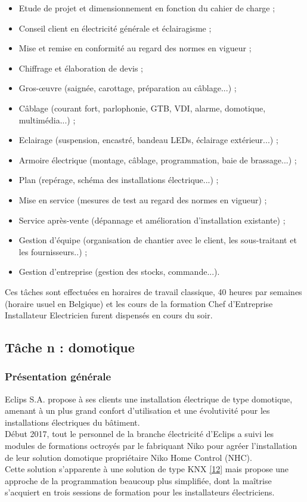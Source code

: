\documentclass[a4paper, 12pt]{article}
\begin{document}
\begin{itemize}

  \item Etude de projet et dimensionnement en fonction du cahier de charge ;
  \item Conseil client en électricité générale et éclairagisme ;  
  \item Mise et remise en conformité au regard des normes en vigueur ;
  \item Chiffrage et élaboration de devis ;
  \item Gros-\oe{}uvre (saignée, carottage, préparation au câblage...) ;
  \item Câblage (courant fort, parlophonie, GTB, VDI, alarme, domotique, multimédia...) ;
  \item Eclairage (suspension, encastré, bandeau LEDs, éclairage extérieur...) ;
  \item Armoire électrique (montage, câblage, programmation, baie de brassage...) ;
  \item Plan (repérage, schéma des installations électrique...) ;
  \item Mise en service (mesures de test au regard des normes en vigueur) ;
  \item Service après-vente (dépannage et amélioration d’installation existante) ;
  \item Gestion d'équipe (organisation de chantier avec le client, les sous-traitant et les fournisseurs..) ;
  \item Gestion d'entreprise (gestion des stocks, commande...).
    
\end{itemize}
Ces tâches sont effectuées en horaires de travail classique, 40 heures par semaines (horaire usuel en Belgique) et les cours de la formation Chef d'Entreprise Installateur Electricien furent dispensés en cours du soir.

\subsection{Tâche n : domotique}

\subsubsection{Présentation générale}

Eclips S.A. propose à ses clients une installation électrique de type domotique, amenant à un plus grand confort d'utilisation et une évolutivité pour les installations électriques du bâtiment.\\
Début 2017, tout le personnel de la branche électricité d'Eclips a suivi les modules de formations octroyés par le fabriquant Niko pour agréer l'installation de leur solution domotique propriétaire Niko Home Control (NHC).\\ Cette solution s'apparente à une solution de type KNX \href{http://www.knx.fr/KNX-France-quest-ce-que-knx.html}{[12]} mais propose une approche de la programmation beaucoup plus simplifiée, dont la maîtrise s'acquiert en trois sessions de formation pour les installateurs électriciens.
\end{document}
